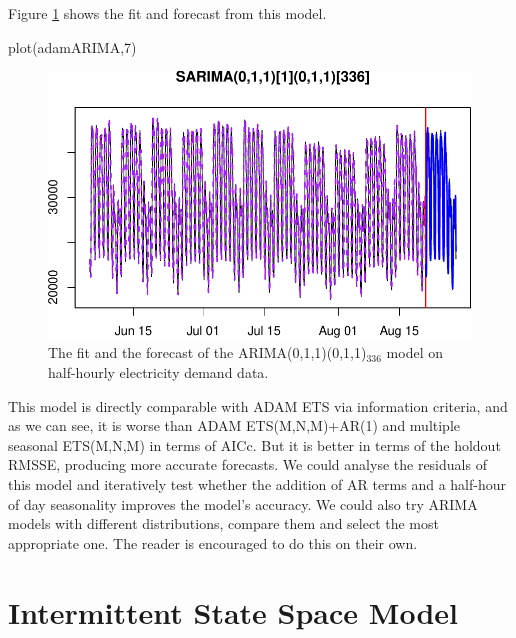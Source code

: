 \documentclass[
]{book}
\newenvironment{Shaded}{\begin{snugshade}}{\end{snugshade}}
\newcommand{\DecValTok}[1]{\textcolor[rgb]{0.00,0.00,0.81}{#1}}
\newcommand{\FunctionTok}[1]{\textcolor[rgb]{0.00,0.00,0.00}{#1}}
\newcommand{\NormalTok}[1]{#1}
\theoremstyle{definition}
\theoremstyle{definition}
\theoremstyle{definition}
\theoremstyle{definition}
\theoremstyle{remark}
\begin{document}
Figure \ref{fig:adamARIMA} shows the fit and forecast from this model.

\begin{Shaded}
\begin{Highlighting}[]
\FunctionTok{plot}\NormalTok{(adamARIMA,}\DecValTok{7}\NormalTok{)}
\end{Highlighting}
\end{Shaded}

\begin{figure}
\centering
\includegraphics{Svetunkov--2022----ADAM_files/figure-latex/adamARIMA-1.pdf}
\caption{\label{fig:adamARIMA}The fit and the forecast of the ARIMA(0,1,1)(0,1,1)\(_{336}\) model on half-hourly electricity demand data.}
\end{figure}

This model is directly comparable with ADAM ETS via information criteria, and as we can see, it is worse than ADAM ETS(M,N,M)+AR(1) and multiple seasonal ETS(M,N,M) in terms of AICc. But it is better in terms of the holdout RMSSE, producing more accurate forecasts. We could analyse the residuals of this model and iteratively test whether the addition of AR terms and a half-hour of day seasonality improves the model's accuracy. We could also try ARIMA models with different distributions, compare them and select the most appropriate one. The reader is encouraged to do this on their own.

\hypertarget{ADAMIntermittent}{%
\chapter{Intermittent State Space Model}\label{ADAMIntermittent}}
\end{document}
